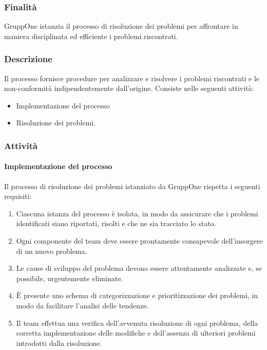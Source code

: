 \documentclass[../../norme-di-progetto.tex]{subfiles}
\begin{document}
\subsubsection{Finalità}%
\label{subs:risoluzione_dei_problemi/finalita}

GruppOne istanzia il processo di risoluzione dei problemi per affrontare in maniera disciplinata ed efficiente i problemi riscontrati.

\subsubsection{Descrizione}%
\label{subs:risoluzione_dei_problemi/descrizione}

Il processo fornisce procedure per analizzare e risolvere i problemi riscontrati e le non-conformità indipendentemente dall'origine.
Consiste nelle seguenti attività:

\begin{itemize}
  \item Implementazione del processo
  \item Risoluzione dei problemi.
\end{itemize}

\subsubsection{Attività}%
\label{subs:risoluzione_dei_problemi/attivita}

\paragraph{Implementazione del processo}%
\label{par:risoluzione_dei_problemi/implementazione_del_processo}

Il processo di risoluzione dei problemi istanziato da GruppOne rispetta i seguenti requisiti:

\begin{enumerate}
  \item Ciascuna istanza del processo è isolata, in modo da assicurare che i problemi identificati siano riportati, risolti e che ne sia tracciato lo stato.
  \item Ogni componente del team deve essere prontamente consapevole dell'insorgere di un nuovo problema.
  \item Le cause di sviluppo del problema devono essere attentamente analizzate e, se possibile, urgentemente eliminate.
  \item È presente uno schema di categorizzazione e prioritizzazione dei problemi, in modo da facilitare l'analisi delle tendenze.
  \item Il team effettua una verifica dell'avvenuta risoluzione di ogni problema, della corretta implementazione delle modifiche e dell'assenza di ulteriori problemi introdotti dalla risoluzione.
\end{enumerate}
\end{document}
